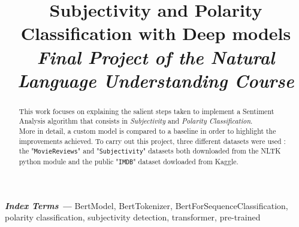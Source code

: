 \documentclass[a4paper, 9pt]{article}
\title{\LARGE{Subjectivity and Polarity Classification with Deep models}\\
\large{\textit{Final Project of the Natural Language Understanding Course}}}
\begin{document}
\maketitle

\begin{abstract}
    This work focuses on explaining the salient steps taken to implement a Sentiment Analysis algorithm that consists in \textit{Subjectivity} and \textit{Polarity Classification}.\\
    More in detail, a custom model is compared to a baseline in order to highlight the improvements achieved. To carry out this project, three different datasets were used : 
    the "\texttt{MovieReviews}" and  "\texttt{Subjectivity}" datasets both downloaded from the NLTK python module and the public "\texttt{IMDB}" dataset dowloaded from Kaggle\cite{kaggle}.\\
\end{abstract}


\textbf{\textit{Index Terms ---}} BertModel, BertTokenizer, BertForSequenceClassification, polarity classification, subjectivity detection, transformer,
pre-trained













\end{document}
